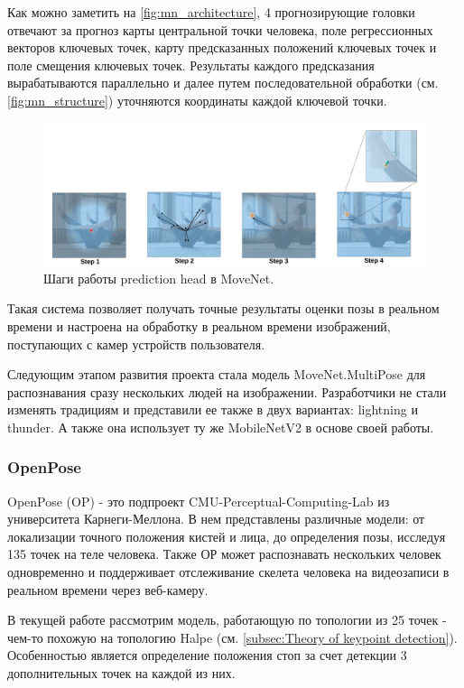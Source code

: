 Как можно заметить на \autoref{fig:mn_architecture}, 4 прогнозирующие головки отвечают за прогноз карты центральной точки человека, поле регрессионных векторов ключевых точек, карту предсказанных положений ключевых точек и поле смещения ключевых точек. Результаты каждого предсказания вырабатываются параллельно и далее путем последовательной обработки (см. \autoref{fig:mn_structure}) уточняются координаты каждой ключевой точки.

\begin{figure}[h]
	\centering
	\includegraphics[width=\textwidth * 4 / 5]{./images/MoveNet/structure}
	\caption{Шаги работы prediction head в MoveNet. \cite{MoveNet}}
	\label{fig:mn_structure}
\end{figure}

Такая система позволяет получать точные результаты оценки позы в реальном времени и настроена на обработку в реальном времени изображений, поступающих с камер устройств пользователя.

Следующим этапом развития проекта стала модель MoveNet.MultiPose для распознавания сразу нескольких людей на изображении. Разработчики не стали изменять традициям и представили ее также в двух вариантах: lightning и thunder. А также она использует ту же MobileNetV2 в основе своей работы.



\subsubsection{OpenPose}
\label{subsubsec:openpose_desc}

OpenPose (OP) - это подпроект CMU-Perceptual-Computing-Lab из университета Карнеги-Меллона. В нем представлены различные модели: от локализации точного положения кистей и лица, до определения позы, исследуя 135 точек на теле человека. Также ОР может распознавать нескольких человек одновременно и поддерживает отслеживание скелета человека на видеозаписи в реальном времени через веб-камеру.

В текущей работе рассмотрим модель, работающую по топологии из 25 точек - чем-то похожую на топологию Halpe (см. \autoref{subsec:Theory of keypoint detection}). Особенностью является определение положения стоп за счет детекции 3 дополнительных точек на каждой из них.

